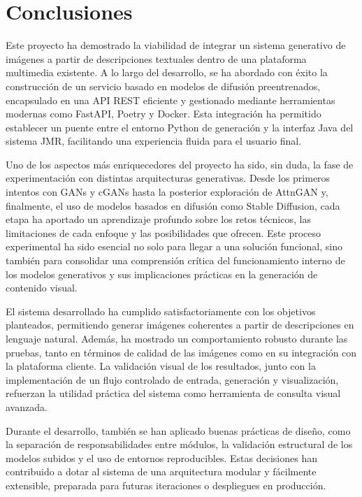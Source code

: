 \section{Conclusiones}

Este proyecto ha demostrado la viabilidad de integrar un sistema generativo de imágenes a partir de descripciones textuales dentro de una plataforma multimedia existente. A lo largo del desarrollo, se ha abordado con éxito la construcción de un servicio basado en modelos de difusión preentrenados, encapsulado en una API REST eficiente y gestionado mediante herramientas modernas como FastAPI, Poetry y Docker. Esta integración ha permitido establecer un puente entre el entorno Python de generación y la interfaz Java del sistema JMR, facilitando una experiencia fluida para el usuario final.

Uno de los aspectos más enriquecedores del proyecto ha sido, sin duda, la fase de experimentación con distintas arquitecturas generativas. Desde los primeros intentos con GANs y cGANs hasta la posterior exploración de AttnGAN y, finalmente, el uso de modelos basados en difusión como Stable Diffusion, cada etapa ha aportado un aprendizaje profundo sobre los retos técnicos, las limitaciones de cada enfoque y las posibilidades que ofrecen. Este proceso experimental ha sido esencial no solo para llegar a una solución funcional, sino también para consolidar una comprensión crítica del funcionamiento interno de los modelos generativos y sus implicaciones prácticas en la generación de contenido visual.

El sistema desarrollado ha cumplido satisfactoriamente con los objetivos planteados, permitiendo generar imágenes coherentes a partir de descripciones en lenguaje natural. Además, ha mostrado un comportamiento robusto durante las pruebas, tanto en términos de calidad de las imágenes como en su integración con la plataforma cliente. La validación visual de los resultados, junto con la implementación de un flujo controlado de entrada, generación y visualización, refuerzan la utilidad práctica del sistema como herramienta de consulta visual avanzada.

Durante el desarrollo, también se han aplicado buenas prácticas de diseño, como la separación de responsabilidades entre módulos, la validación estructural de los modelos subidos y el uso de entornos reproducibles. Estas decisiones han contribuido a dotar al sistema de una arquitectura modular y fácilmente extensible, preparada para futuras iteraciones o despliegues en producción.

